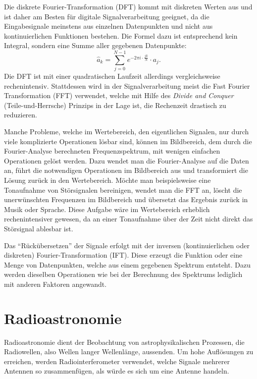 \documentclass[]{dsadokumentation}
\begin{document}
Die diskrete Fourier-Transformation (DFT) kommt mit diskreten Werten aus und ist daher am Besten für digitale Signalverarbeitung geeignet, da die Eingabesignale meinstens aus einzelnen Datenpunkten und nicht aus kontinuierlichen Funktionen bestehen. Die Formel dazu ist entsprechend kein Integral, sondern eine Summe aller gegebenen Datenpunkte: 
\begin{displaymath}
\hat a_k = \sum\limits_{j=0}^{N-1}e^{-2\pi i\cdot\frac{jk}{N}}\cdot a_j.
\end{displaymath}
Die DFT ist mit einer quadratischen Laufzeit allerdings vergleichsweise rechenintensiv. Stattdessen wird in der Signalverarbeitung meist die Fast Fourier Transformation (FFT) verwendet, welche mit Hilfe des \emph{Divide and Conquer} (Teile-und-Herrsche) Prinzips in der Lage ist, die Rechenzeit drastisch zu reduzieren.

Manche Probleme, welche im Wertebereich, den eigentlichen Signalen, nur durch viele komplizierte Operationen l\"osbar sind, k\"onnen im Bildbereich, dem durch die Fourier-Analyse berechneten Frequenzspektrum, mit wenigen einfachen Operationen gel\"ost werden. Dazu wendet man die Fourier-Analyse auf die Daten an, führt die notwendigen Operationen im Bildbereich aus und transformiert die Lösung zurück in den Wertebereich. Möchte man beispielsweise eine Tonaufnahme von Störsignalen bereinigen, wendet man die FFT an, löscht die unerwünschten Frequenzen im Bildbereich und übersetzt das Ergebnis zurück in Musik oder Sprache. Diese Aufgabe w\"are im Wertebereich erheblich rechenintensiver gewesen, da an einer Tonaufnahme über der Zeit nicht direkt das Störsignal ablesbar ist.

Das \enquote{Rückübersetzen} der Signale erfolgt mit der inversen (kontinuierlichen oder diskreten) Fourier-Transformation (IFT). Diese erzeugt die Funktion oder eine Menge von Datenpunkten, welche aus einem gegebenen Spektrum entsteht. Dazu werden dieselben Operationen wie bei der Berechnung des Spektrums lediglich mit anderen Faktoren angewandt.




\section{Radioastronomie}

Radioastronomie dient der Beobachtung von astrophysikalischen Prozessen, die Radiowellen, also Wellen langer Wellenlänge, aussenden. Um hohe Auflösungen zu erreichen, werden Radiointerferometer verwendet, welche Signale mehrerer Antennen so zusammenfügen, als würde es sich um eine Antenne handeln.
\end{document}
